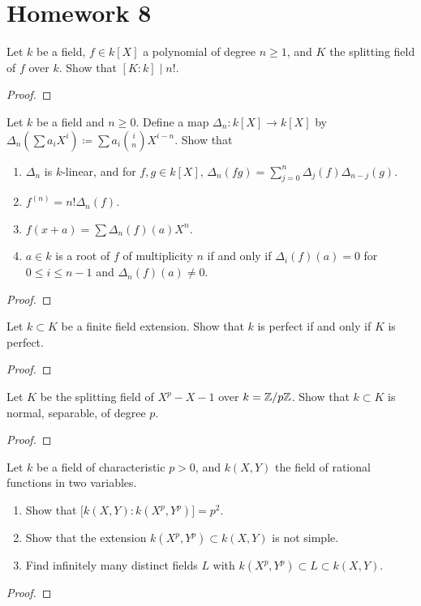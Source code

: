 \section{Homework 8}
\begin{problem}
Let $k$ be a field, $f\in k[X]$ a polynomial of degree $n\geq 1$, and $K$
the splitting field of $f$ over $k$. Show that $[K:k]\mid n!$.
\end{problem}
\begin{proof}
\end{proof}

\begin{problem}
Let $k$ be a field and $n\geq 0$. Define a map $\Delta_n\colon k[X]\to
k[X]$ by $\Delta_n\left(\sum a_iX^i\right)\coloneqq\sum a_i\binom{i}{n}
X^{i-n}$. Show that
\begin{enumerate}[label=(\alph*)]
\item $\Delta_n$ is $k$-linear, and for $f,g\in k[X]$,
  $\Delta_n(fg)=\sum_{j=0}^n\Delta_j(f)\Delta_{n-j}(g)$.
\item $f^{(n)}=n!\Delta_n(f)$.
\item $f(x+a)=\sum\Delta_n(f)(a)X^n$.
\item $a\in k$ is a root of $f$ of multiplicity $n$ if and only if
  $\Delta_i(f)(a)=0$ for $0\leq i\leq n-1$ and $\Delta_n(f)(a)\neq 0$.
\end{enumerate}
\end{problem}
\begin{proof}
\end{proof}

\begin{problem}
Let $k\subset K$ be a finite field extension. Show that $k$ is perfect if
and only if $K$ is perfect.
\end{problem}
\begin{proof}
\end{proof}

\begin{problem}
Let $K$ be the splitting field of $X^p-X-1$ over $k=\mathbb{Z}/p\mathbb{Z}$. Show that
$k\subset K$ is normal, separable, of degree $p$.
\end{problem}
\begin{proof}
\end{proof}

\begin{problem}
Let $k$ be a field of characteristic $p>0$, and $k(X,Y)$ the field of
rational functions in two variables.
\begin{enumerate}[label=(\alph*)]
\item Show that $\bigl[k(X,Y):k(X^p,Y^p)\bigr]=p^2$.
\item Show that the extension $k(X^p,Y^p)\subset k(X,Y)$ is not simple.
\item Find infinitely many distinct fields $L$ with $k(X^p,Y^p)\subset
  L\subset k(X,Y)$.
\end{enumerate}
\end{problem}
\begin{proof}
\end{proof}

